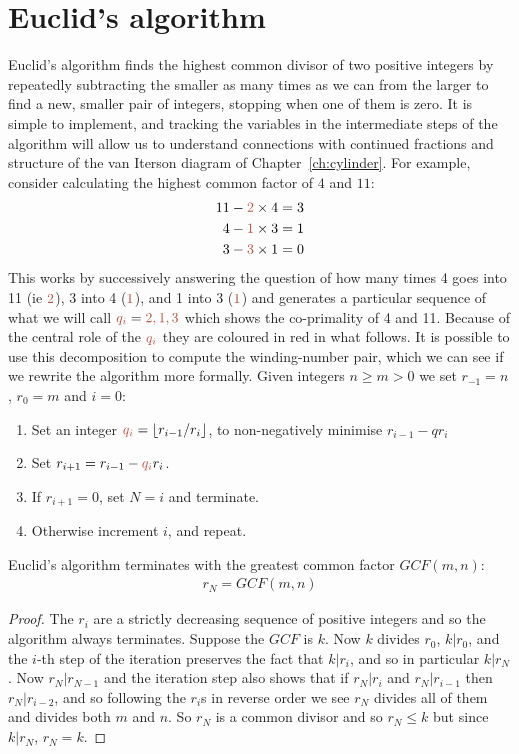 \section{Euclid's algorithm}
\label{sec:euclid}
Euclid's algorithm finds the highest common divisor of two positive integers by repeatedly subtracting the smaller as many times as we can from the larger to find a new, smaller pair of integers,  stopping when one of them is zero. It is  simple to implement, and tracking the variables in the intermediate steps of the algorithm will allow us to understand connections with continued fractions and structure of the van Iterson diagram of Chapter~\ref{ch:cylinder}.
For example, consider calculating the highest common factor of $4$ and $11$:
\begin{align}
	11 - {\jHeadingColour 2}\times 4 & = 3 
	\\
	4 - {\jHeadingColour 1}\times 3 & = 1\label{eq:411}
	\\
	3 - {\jHeadingColour 3}\times 1 & = 0 
\end{align}
%
This works by successively answering the question of how many times 4 goes into 11 (ie ${\jHeadingColour 2}$), 3 into 4  (${\jHeadingColour 1}$), and 1 into 3 (${\jHeadingColour 1}$) and generates 
a particular sequence of what we will call  $\jqi={\jHeadingColour 2, 1, 3}$ which shows the co-primality of 4 and 11. Because of the central role of the $\jqi$ they are coloured in red in what follows. It is possible to use this decomposition to compute the winding-number pair, which we can see if we rewrite the algorithm more formally. 
Given integers $n\geq m>0$  we set $r_{-1}=n$, $r_0=m$ and $i=0$:
\begin{enumerate}
	\item Set an integer $\jqi=\lfloor r_{i-1}/r_i \rfloor $, to non-negatively minimise $r_{i-1}-q r_{i}$ 
	\item  Set  $r_{i+1}=r_{i-1}-\jqi r_{i}$. 
	\item If $r_{i+1}=0$, set $N=i$ and terminate.
	\item Otherwise increment $i$, and repeat.
\end{enumerate}
\begin{theorem}
	Euclid's algorithm terminates with the greatest common factor $GCF(m,n)$:
	\begin{eqnarray}
		r_N =  
		GCF(m,n) 
	\end{eqnarray}
\end{theorem}
\begin{proof}
	The $r_i$ are a strictly decreasing sequence of positive integers and so the algorithm always terminates. Suppose the $GCF$ is $k$. Now $k$ divides $r_0$, $k|r_0$, and the $i$-th step of the iteration preserves the fact that  $k|r_i$,  and so in particular $k|r_N$. Now $r_N|r_{N-1}$ and the iteration step also shows that if $r_N|r_i$ and $r_N|r_{i-1}$ then $r_N|r_{i-2}$, and so following the $r_i$s in reverse order we see $r_N$ divides all of them and divides both $m$ and $n$.  So $r_N$ is a common divisor and so $r_N\leq k$ but since $k|r_N$, $r_N=k$. 
\end{proof}


